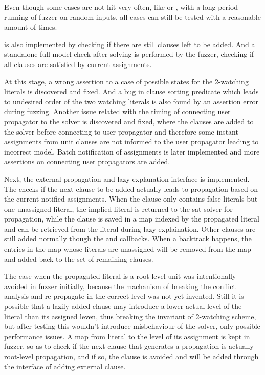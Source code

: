Even though some cases are not hit very often, like  or , with a long period running of fuzzer on random inputs, all cases can still be tested with a reasonable amount of times.

 is also implemented by checking if there are still clauses left to be added. And a standalone full model check after solving is performed by the fuzzer, checking if all clauses are satisfied by current assignments.

At this stage, a wrong assertion to a case of possible states for the 2-watching literals is discovered and fixed. And a bug in clause sorting predicate which leads to undesired order of the two watching literals is also found by an assertion error during fuzzing. Another issue related with the timing of connecting user propagator to the solver is discovered and fixed, where the clauses are added to the solver before connecting to user propagator and therefore some instant assignments from unit clauses are not informed to the user propagator leading to incorrect model. Batch notification of assignments is later implemented and more assertions on connecting user propagators are added.

Next, the external propagation and lazy explanation interface is implemented. The  checks if the next clause to be added actually leads to propagation based on the current notified assignments. When the clause only contains false literals but one unassigned literal, the implied literal is returned to the sat solver for propagation, while the clause is saved in a map indexed by the propagated literal and can be retrieved from the literal during lazy explaination. Other clauses are still added normally though the  and  callbacks. When a backtrack happens, the entries in the map whose literals are unassigned will be removed from the map and added back to the set of remaining clauses.

The case when the propagated literal is a root-level unit was intentionally avoided in fuzzer initially, because the machanism of breaking the conflict analysis and re-propagate in the correct level was not yet invented. Still it is possible that a lazily added clause may introduce a lower actual level of the literal than its assigned leven, thus breaking the invariant of 2-watching scheme, but after testing this wouldn't introduce misbehaviour of the solver, only possible performance issues. A map from literal to the level of its assignment is kept in fuzzer, so as to check if the next clause that generates a propagation is actually root-level propagation, and if so, the clause is avoided and will be added through the interface of adding external clause.


